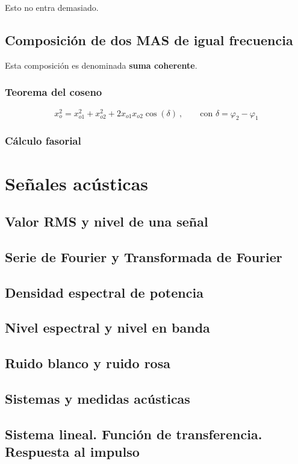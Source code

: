\documentclass[a4paper]{book}
\begin{document}
Esto no entra demasiado.

\section{Composición de dos MAS de igual frecuencia}

Esta composición es denominada \textbf{suma coherente}.

\subsection{Teorema del coseno}

\[ x_o^2 = x_{o1}^2 + x_{o2}^2 + 2x_{o1}x_{o2}\cos \left( \delta \right) \ , \qquad \textrm{con }\delta = \varphi_2 - \varphi_1\]

\subsection{Cálculo fasorial}

\chapter{Señales acústicas}
\section{Valor RMS y nivel de una señal}
\section{Serie de Fourier y Transformada de Fourier}
\section{Densidad espectral de potencia}
\section{Nivel espectral y nivel en banda}
\section{Ruido blanco y ruido rosa}
\section{Sistemas y medidas acústicas}
\section{Sistema lineal. Función de transferencia. Respuesta al impulso}
\end{document}
